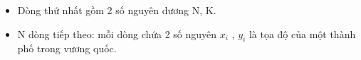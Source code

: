 \begin{itemize}
	\item Dòng thứ nhất gồm 2 số nguyên dương N, K.
	\item N dòng tiếp theo: mỗi dòng chứa 2 số nguyên $x_{i}$ , $y_{i}$ là tọa độ của một thành phố trong vương quốc.
\end{itemize}